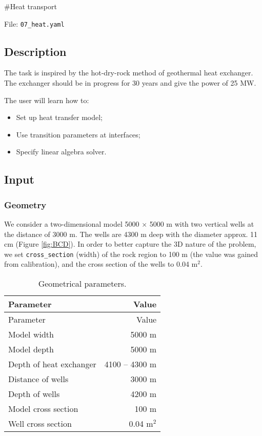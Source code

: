 \#Heat transport

File: \texttt{07\_heat.yaml}

\subsection{Description}

The task is inspired by the hot-dry-rock method of geothermal heat
exchanger. The exchanger should be in progress for 30 years and give the
power of 25 MW.

The user will learn how to:

\begin{itemize}
\tightlist
\item
  Set up heat transfer model;
\item
  Use transition parameters at interfaces;
\item
  Specify linear algebra solver.
\end{itemize}

\subsection{Input}

\subsubsection{Geometry}

We consider a two-dimensional model 5000 \(\times\) 5000 m with two
vertical wells at the distance of 3000 m. The wells are 4300 m deep with
the diameter approx. 11 cm (Figure \ref{fig:BCD}). In order to better
capture the 3D nature of the problem, we set \texttt{cross\_section}
(width) of the rock region to 100 m (the value was gained from
calibration), and the cross section of the wells to 0.04 m\({}^2\).

\begin{longtable}[]{@{}lr@{}}
\caption{Geometrical parameters.
\label{tbl:water_balance}}\tabularnewline
\toprule
Parameter & Value\tabularnewline
\midrule
\endfirsthead
\toprule
Parameter & Value\tabularnewline
\midrule
\endhead
Model width & 5000 m\tabularnewline
Model depth & 5000 m\tabularnewline
Depth of heat exchanger & 4100 -- 4300 m\tabularnewline
Distance of wells & 3000 m\tabularnewline
Depth of wells & 4200 m\tabularnewline
Model cross section & 100 m\tabularnewline
Well cross section & 0.04 m\({}^2\)\tabularnewline
\bottomrule
\end{longtable}

